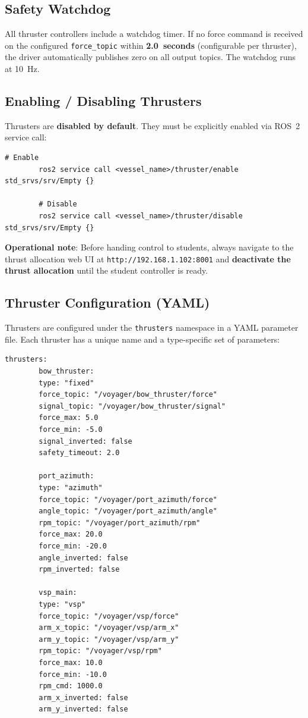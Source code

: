 \documentclass[12pt,a4paper]{article}
\begin{document}
	\subsection{Safety Watchdog}
	
	All thruster controllers include a watchdog timer. If no force command is received on the
	configured \texttt{force\_topic} within \textbf{2.0~seconds} (configurable per thruster), the
	driver automatically publishes zero on all output topics. The watchdog runs at 10~Hz.
	
	\subsection{Enabling / Disabling Thrusters}
	
	Thrusters are \textbf{disabled by default}. They must be explicitly enabled via ROS~2 service
	call:
	
	\begin{lstlisting}[style=bash]
		# Enable
		ros2 service call <vessel_name>/thruster/enable std_srvs/srv/Empty {}
		
		# Disable
		ros2 service call <vessel_name>/thruster/disable std_srvs/srv/Empty {}
	\end{lstlisting}
	
	\textbf{Operational note}: Before handing control to students, always navigate to the thrust
	allocation web UI at \texttt{http://192.168.1.102:8001} and \textbf{deactivate the thrust
		allocation} until the student controller is ready.
	
	\subsection{Thruster Configuration (YAML)}
	
	Thrusters are configured under the \texttt{thrusters} namespace in a YAML parameter file.
	Each thruster has a unique name and a type-specific set of parameters:
	
	\begin{lstlisting}[style=yaml]
		thrusters:
		bow_thruster:
		type: "fixed"
		force_topic: "/voyager/bow_thruster/force"
		signal_topic: "/voyager/bow_thruster/signal"
		force_max: 5.0
		force_min: -5.0
		signal_inverted: false
		safety_timeout: 2.0
		
		port_azimuth:
		type: "azimuth"
		force_topic: "/voyager/port_azimuth/force"
		angle_topic: "/voyager/port_azimuth/angle"
		rpm_topic: "/voyager/port_azimuth/rpm"
		force_max: 20.0
		force_min: -20.0
		angle_inverted: false
		rpm_inverted: false
		
		vsp_main:
		type: "vsp"
		force_topic: "/voyager/vsp/force"
		arm_x_topic: "/voyager/vsp/arm_x"
		arm_y_topic: "/voyager/vsp/arm_y"
		rpm_topic: "/voyager/vsp/rpm"
		force_max: 10.0
		force_min: -10.0
		rpm_cmd: 1000.0
		arm_x_inverted: false
		arm_y_inverted: false
	\end{lstlisting}
	
\end{document}
